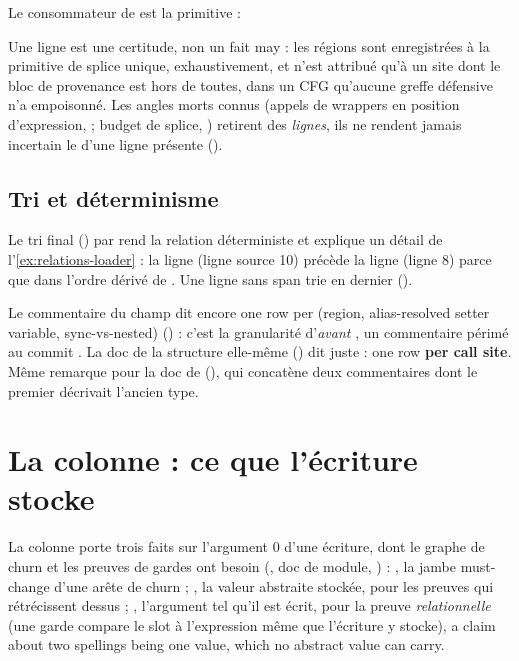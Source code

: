 Le consommateur de  est la primitive  :


Une ligne  est une certitude, non un fait may : les régions sont enregistrées à la primitive de splice unique, exhaustivement, et  n'est attribué qu'à un site dont le bloc de provenance est hors de toutes, dans un CFG qu'aucune greffe défensive n'a empoisonné. Les angles morts connus (appels de wrappers en position d'expression,  ; budget de splice, ) retirent des \emph{lignes}, ils ne rendent jamais incertain le  d'une ligne présente ().

\subsection{Tri et déterminisme}

Le tri final () par  rend la relation déterministe et explique un détail de l'\cref{ex:relations-loader} : la ligne  (ligne source 10) précède la ligne  (ligne 8) parce que  dans l'ordre dérivé de . Une ligne sans span trie en dernier ().

\begin{piege}
Le commentaire du champ  dit encore \og one row per (region, alias-resolved setter variable, sync-vs-nested)\fg{} () : c'est la granularité d'\emph{avant} , un commentaire périmé au commit \snapshotCommit. La doc de la structure elle-même () dit juste : \og one row \textbf{per call site}\fg{}. Même remarque pour la doc de  (), qui concatène deux commentaires dont le premier décrivait l'ancien type.
\end{piege}

\section{La colonne  : ce que l'écriture stocke}
\label{sec:relations-written}
La colonne  porte trois faits sur l'argument 0 d'une écriture, dont le graphe de churn et les preuves de gardes ont besoin (, doc de module, ) : , la jambe \og must-change\fg{} d'une arête de churn ; , la valeur abstraite stockée, pour les preuves qui rétrécissent dessus ; , l'argument tel qu'il est écrit, pour la preuve \emph{relationnelle} (une garde compare le slot à l'expression même que l'écriture y stocke), \og a claim about two spellings being one value, which no abstract value can carry\fg{}.

